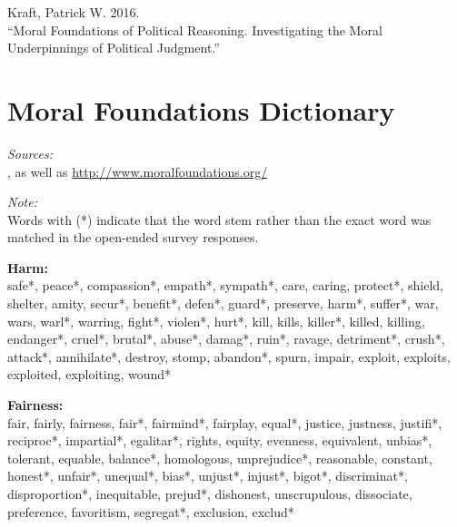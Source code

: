 \documentclass[12pt]{article}
\begin{document}


\clearpage



\clearpage
\footnotesize\singlespacing
\appendices
\appendixpage
\renewcommand\thesubsection{\Roman{subsection}}
\begin{flushleft}
Kraft, Patrick W. 2016.\\``Moral Foundations of Political Reasoning. Investigating the Moral Underpinnings of Political Judgment.''

\startcontents[sections]
\clearpage

\section{Moral Foundations Dictionary}\label{app:dict}
\renewcommand\thefigure{\thesection.\arabic{figure}}
\renewcommand\thetable{\thesection.\arabic{table}}
\setcounter{figure}{0}
\setcounter{table}{0}

\textit{Sources:}\\
\citet{graham2009liberals}, as well as \url{http://www.moralfoundations.org/}
\vspace{.5cm}

\textit{Note:}\\
Words with (*) indicate that the word stem rather than the exact word was matched in the open-ended survey responses.
\vspace{.5cm}

\textbf{Harm:}\\
safe*, peace*, compassion*, empath*, sympath*, care, caring, protect*, shield, shelter, amity, secur*, benefit*, defen*, guard*, preserve, harm*, suffer*, war, wars, warl*, warring, fight*, violen*, hurt*, kill, kills, killer*, killed, killing, endanger*, cruel*, brutal*, abuse*, damag*, ruin*, ravage, detriment*, crush*, attack*, annihilate*, destroy, stomp, abandon*, spurn, impair, exploit, exploits, exploited, exploiting, wound*
\vspace{.5cm}

\textbf{Fairness:}\\
fair, fairly, fairness, fair*, fairmind*, fairplay, equal*, justice, justness, justifi*, reciproc*, impartial*, egalitar*, rights, equity, evenness, equivalent, unbias*, tolerant, equable, balance*, homologous, unprejudice*, reasonable, constant, honest*, unfair*, unequal*, bias*, unjust*, injust*, bigot*, discriminat*, disproportion*, inequitable, prejud*, dishonest, unscrupulous, dissociate, preference, favoritism, segregat*, exclusion, exclud*
\vspace{.5cm}


\end{flushleft}
\end{document}
